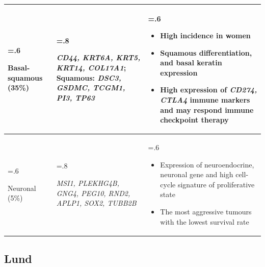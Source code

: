 \begin{appendices}
\begin{table}[H]
\begin{tabularx}{\textwidth}{
      >{\hsize=.6\hsize\raggedright\arraybackslash}X
      >{\hsize=.8\hsize\raggedright\arraybackslash}X
      >{\hsize=.6\hsize\arraybackslash}X
    }
    \midrule
    Basal-squamous (35\%) &\textit{ CD44, KRT6A, KRT5, KRT14, COL17A1}; Squamous: \textit{DSC3, GSDMC, TCGM1, PI3, TP63} & 
    \begin{itemize}[leftmargin=*, nosep, after=\vspace{-\baselineskip}, before=\vspace{-.6\baselineskip}]
        \item High incidence in women
        \item Squamous differentiation, and basal keratin expression
        \item High expression of \textit{CD274, CTLA4} immune markers and may respond immune checkpoint therapy
    \end{itemize} \\
    \midrule
    Neuronal (5\%) &\textit{ MSI1, PLEKHG4B, GNG4, PEG10, RND2, APLP1, SOX2, TUBB2B} & 
    \begin{itemize}[leftmargin=*, nosep, after=\vspace{-\baselineskip}, before=\vspace{-.6\baselineskip}]
        \item Expression of neuroendocrine, neuronal gene and high cell-cycle signature of proliferative state
        \item The most aggressive tumours with the lowest survival rate
    \end{itemize} \\
    \bottomrule
    \end{tabularx}
    \label{tab:lit:tcga_genes}
\end{table}

\subsection{Lund}


\end{appendices}
